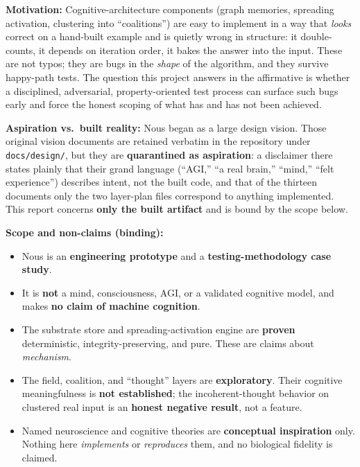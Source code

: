 \documentclass[11pt]{article}
\newcommand{\code}[1]{\texttt{#1}}
\begin{document}
\textbf{Motivation:} Cognitive-architecture components (graph memories, spreading activation,
clustering into ``coalitions'') are easy to implement in a way that \emph{looks} correct on a
hand-built example and is quietly wrong in structure: it double-counts, it depends on iteration order,
it bakes the answer into the input. These are not typos; they are bugs in the \emph{shape} of the
algorithm, and they survive happy-path tests. The question this project answers in the affirmative is
whether a disciplined, adversarial, property-oriented test process can surface such bugs early and
force the honest scoping of what has and has not been achieved.

\textbf{Aspiration vs.\ built reality:} Nous began as a large design vision. Those original vision
documents are retained verbatim in the repository under \code{docs/design/}, but they are
\textbf{quarantined as aspiration}: a disclaimer there states plainly that their grand language
(``AGI,'' ``a real brain,'' ``mind,'' ``felt experience'') describes intent, not the built code, and
that of the thirteen documents only the two layer-plan files correspond to anything implemented. This
report concerns \textbf{only the built artifact} and is bound by the scope below.

\textbf{Scope and non-claims (binding):}
\begin{itemize}[nosep]
  \item Nous is an \textbf{engineering prototype} and a \textbf{testing-methodology case study}.
  \item It is \textbf{not} a mind, consciousness, AGI, or a validated cognitive model, and makes
        \textbf{no claim of machine cognition}.
  \item The substrate store and spreading-activation engine are \textbf{proven} deterministic,
        integrity-preserving, and pure. These are claims about \emph{mechanism}.
  \item The field, coalition, and ``thought'' layers are \textbf{exploratory}. Their cognitive
        meaningfulness is \textbf{not established}; the incoherent-thought behavior on clustered real
        input is an \textbf{honest negative result}, not a feature.
  \item Named neuroscience and cognitive theories are \textbf{conceptual inspiration} only. Nothing
        here \emph{implements} or \emph{reproduces} them, and no biological fidelity is claimed.
\end{itemize}
\end{document}
